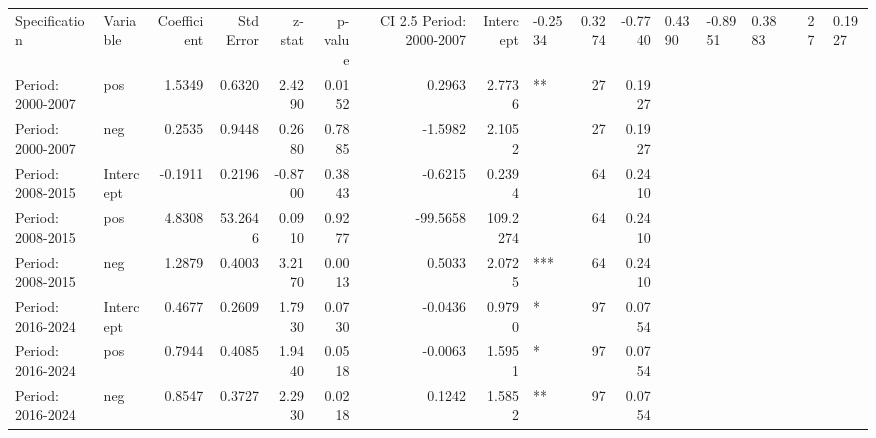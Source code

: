 \begin{tabular}{llrrrrrrlrr}
\toprule
Specification & Variable & Coefficient & Std Error & z-stat & p-value & CI 2.5%
\midrule
Period: 2000-2007 & Intercept & -0.2534 & 0.3274 & -0.7740 & 0.4390 & -0.8951 & 0.3883 &  & 27 & 0.1927 \\
Period: 2000-2007 & pos & 1.5349 & 0.6320 & 2.4290 & 0.0152 & 0.2963 & 2.7736 & ** & 27 & 0.1927 \\
Period: 2000-2007 & neg & 0.2535 & 0.9448 & 0.2680 & 0.7885 & -1.5982 & 2.1052 &  & 27 & 0.1927 \\
Period: 2008-2015 & Intercept & -0.1911 & 0.2196 & -0.8700 & 0.3843 & -0.6215 & 0.2394 &  & 64 & 0.2410 \\
Period: 2008-2015 & pos & 4.8308 & 53.2646 & 0.0910 & 0.9277 & -99.5658 & 109.2274 &  & 64 & 0.2410 \\
Period: 2008-2015 & neg & 1.2879 & 0.4003 & 3.2170 & 0.0013 & 0.5033 & 2.0725 & *** & 64 & 0.2410 \\
Period: 2016-2024 & Intercept & 0.4677 & 0.2609 & 1.7930 & 0.0730 & -0.0436 & 0.9790 & * & 97 & 0.0754 \\
Period: 2016-2024 & pos & 0.7944 & 0.4085 & 1.9440 & 0.0518 & -0.0063 & 1.5951 & * & 97 & 0.0754 \\
Period: 2016-2024 & neg & 0.8547 & 0.3727 & 2.2930 & 0.0218 & 0.1242 & 1.5852 & ** & 97 & 0.0754 \\
\bottomrule
\end{tabular}
